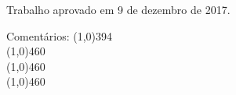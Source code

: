 \documentclass[
	12pt,				%
	openright,			%
	oneside,			%
	a4paper,			%
	chapter=TITLE,		%
	english,			%
	french,				%
	spanish,			%
	brazil				%
	]{abntex2}
\begin{document}

%
% 
%
\begin{folhadeaprovacao}

  \begin{center}
    {\ABNTEXchapterfont\large\imprimirautor}

    \vspace*{\fill}\vspace*{\fill}
    \begin{center}
      \ABNTEXchapterfont\bfseries\Large\imprimirtitulo
    \end{center}
    \vspace*{\fill}
    
    \hspace{.45\textwidth}
    \begin{minipage}{.5\textwidth}
        \imprimirpreambulo
    \end{minipage}%
    \vspace*{\fill}
   \end{center}

   \begin{center}
      Trabalho aprovado em 9 de dezembro de 2017.
   \end{center}


   
   
   \vspace{1.5cm}
   \noindent
   Comentários: \line(1,0){394} \\
   \line(1,0){460} \\
   \line(1,0){460} \\
   \line(1,0){460}
      
   \begin{center}
    \vspace*{0.5cm}
    {\large\imprimirlocal}
    \par
    {\large\imprimirdata}
    \vspace*{1cm}
  \end{center}
  
\end{folhadeaprovacao}
\end{document}

